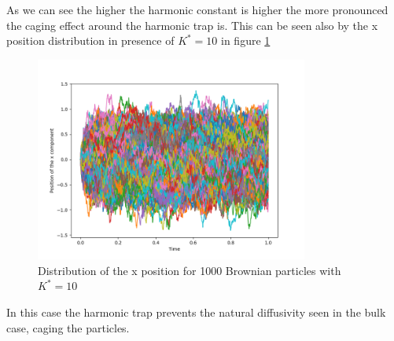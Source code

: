 As we can see the higher the harmonic constant is higher the more pronounced the caging effect around the harmonic trap is. 
This can be seen also by the x position distribution in presence of $K^* = 10$ in figure \ref{ex11:x_pos_harm}

\begin{figure}[htp]
    \centering
    \includegraphics[width=0.8\textwidth]{FIG/ex11/x_component_harm.png}
    \caption{Distribution of the x position for 1000 Brownian particles with $K^* = 10$}
    \label{ex11:x_pos_harm}
\end{figure}

In this case the harmonic trap prevents the natural diffusivity seen in the bulk case, caging the particles.



